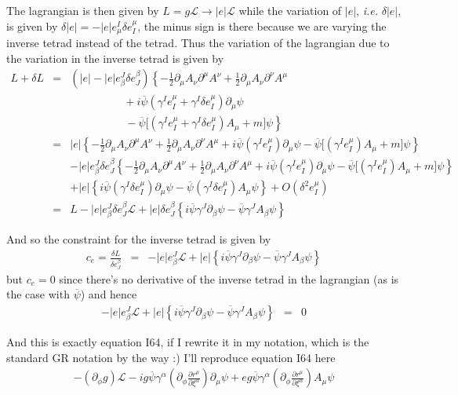 \documentclass[aps,preprint,preprintnumbers,nofootinbib,showpacs,prd]{revtex4-1}
\newcommand{\ie}{{\it i.e.} }
\newcommand{\nbea}{\begin{eqnarray*}}
\newcommand{\neea}{\end{eqnarray*}}
\begin{document}
The lagrangian is then given by $L = g\mathcal{L} \rightarrow |e|\mathcal{L}$ while the variation of $|e|$, \ie $\delta|e|$, is given by $\delta|e| = -|e|e^I_\mu \delta e^\mu_I$, the minus sign is there because we are varying the inverse tetrad instead of the tetrad. Thus the variation of the lagrangian due to the variation in the inverse tetrad is given by
%
\nbea
L + \delta L & = & (|e| - |e|e^J_\beta \delta e^\beta_J) \left \{ -\frac{1}{2} \partial_\mu A_\nu \partial^\mu A^\nu + \frac{1}{2} \partial_\mu A_\nu \partial^\nu A^\mu \right . \\
& & ~~~~~~~~~~~~~~~~~~~~~~ + i \overline \psi (\gamma^I e^\mu_I + \gamma^I \delta e^\mu_I) \partial_\mu \psi \\
& & \left . \frac{}{} ~~~~~~~~~~~~~~~~~~~~~~ - \overline \psi \lbrack (\gamma^I e^\mu_I + \gamma^I \delta e^\mu_I) A_\mu + m \rbrack \psi \right \} \\
& = & |e| \left \{ -\frac{1}{2} \partial_\mu A_\nu \partial^\mu A^\nu + \frac{1}{2} \partial_\mu A_\nu \partial^\nu A^\mu + i \overline \psi (\gamma^I e^\mu_I) \partial_\mu \psi - \overline \psi \lbrack (\gamma^I e^\mu_I) A_\mu + m \rbrack \psi \right \} \\
& & - |e|e^J_\beta \delta e^\beta_J \left \{ -\frac{1}{2} \partial_\mu A_\nu \partial^\mu A^\nu + \frac{1}{2} \partial_\mu A_\nu \partial^\nu A^\mu + i \overline \psi (\gamma^I e^\mu_I) \partial_\mu \psi - \overline \psi \lbrack (\gamma^I e^\mu_I) A_\mu + m \rbrack \psi \right \} \\
& & + |e| \left \{ i \overline \psi (\gamma^I \delta e^\mu_I) \partial_\mu \psi - \overline \psi (\gamma^I \delta e^\mu_I) A_\mu \psi \right \}  + O(\delta^2 e^\mu_I)\\
& = & L  - |e|e^J_\beta \delta e^\beta_J \mathcal{L}  + |e| \delta e^\beta_J \left \{ i \overline \psi \gamma^J \partial_\beta \psi - \overline \psi \gamma^J A_\beta \psi \right \}
\neea
%

And so the constraint for the inverse tetrad is given by
%
\nbea
c_e = \frac{\delta L}{\delta e^\beta_J} & = & - |e|e^J_\beta \mathcal{L}  + |e| \left \{ i \overline \psi \gamma^J \partial_\beta \psi - \overline \psi \gamma^J A_\beta \psi \right \}
\neea
%
but $c_e = 0$ since there's no derivative of the inverse tetrad in the lagrangian (as is the case with $\overline \psi$) and hence
%
\nbea
- |e|e^J_\beta \mathcal{L}  + |e| \left \{ i \overline \psi \gamma^J \partial_\beta \psi - \overline \psi \gamma^J A_\beta \psi \right \} & = & 0
\neea
%

And this is exactly equation I64, if I rewrite it in my notation, which is the standard GR notation by the way :) I'll reproduce equation I64 here
%
\nbea
-(\partial_\phi g) \mathcal{L} - i g \overline \psi \gamma^\alpha \left ( \partial_\phi \frac{\partial r^\mu}{\partial \xi^\alpha} \right ) \partial_\mu \psi + e g \overline \psi \gamma^\alpha \left ( \partial_\phi \frac{\partial r^\mu}{\partial \xi^\alpha} \right ) A_\mu \psi
\neea
%
\end{document}
